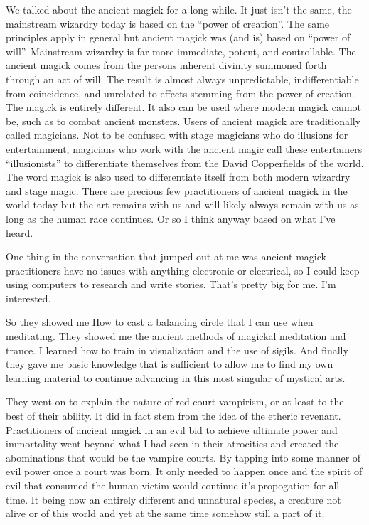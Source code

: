 We talked about the ancient magick for a long while. It just isn't the same, the mainstream wizardry today is based on the ``power of creation''. The same principles apply in general but ancient magick was (and is) based on ``power of will''. Mainstream wizardry is far more immediate, potent, and controllable. The ancient magick comes from the persons inherent divinity summoned forth through an act of will. The result is almost always unpredictable, indifferentiable from coincidence, and unrelated to effects stemming from the power of creation. The magick is entirely different. It also can be used where modern magick cannot be, such as to combat ancient monsters. Users of ancient magick are traditionally called magicians. Not to be confused with stage magicians who do illusions for entertainment, magicians who work with the ancient magic call these entertainers ``illusionists'' to differentiate themselves from the David Copperfields of the world. The word magick is also used to differentiate itself from both modern wizardry and stage magic. There are precious few practitioners of ancient magick in the world today but the art remains with us and will likely always remain with us as long as the human race continues. Or so I think anyway based on what I've heard.

One thing in the conversation that jumped out at me was ancient magick practitioners have no issues with anything electronic or electrical, so I could keep using computers to research and write stories. That's pretty big for me. I'm interested.

So they showed me How to cast a balancing circle that I can use when meditating. They showed me the ancient methods of magickal meditation and trance. I learned how to train in visualization and the use of sigils. And finally they gave me basic knowledge that is sufficient to allow me to find my own learning material to continue advancing in this most singular of mystical arts.

They went on to explain the nature of red court vampirism, or at least to the best of their ability. It did in fact stem from the idea of the etheric revenant. Practitioners of ancient magick in an evil bid to achieve ultimate power and immortality went beyond what I had seen in their atrocities and created the abominations that would be the vampire courts. By tapping into some manner of evil power once a court was born. It only needed to happen once and the spirit of evil that consumed the human victim would continue it's propogation for all time. It being now an entirely different and unnatural species, a creature not alive or of this world and yet at the same time somehow still a part of it.

